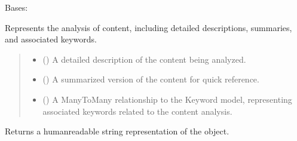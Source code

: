 \documentclass[letterpaper,10pt,english]{sphinxmanual}
\begin{document}
\begin{fulllineitems}
\label{\detokenize{source/meta_models_management:meta_models_management.models.ContentAnalysis}}
\pysigstartsignatures
{}
\pysigstopsignatures
\sphinxAtStartPar
Bases: 

\sphinxAtStartPar
Represents the analysis of content, including detailed descriptions, summaries, and associated keywords.
\begin{quote}\begin{description}
\begin{itemize}
\item {} 
\sphinxAtStartPar
{} () \textendash{} A detailed description of the content being analyzed.

\item {} 
\sphinxAtStartPar
{} () \textendash{} A summarized version of the content for quick reference.

\item {} 
\sphinxAtStartPar
{} () \textendash{} A ManyToMany relationship to the Keyword model, representing associated keywords related to the content analysis.

\end{itemize}

\end{description}\end{quote}

\begin{fulllineitems}
\label{\detokenize{source/meta_models_management:meta_models_management.models.ContentAnalysis.__str__}}
\pysigstartsignatures
{}
\pysigstopsignatures
\sphinxAtStartPar
Returns a human\sphinxhyphen{}readable string representation of the object.


\end{fulllineitems}
\end{fulllineitems}
\end{document}
